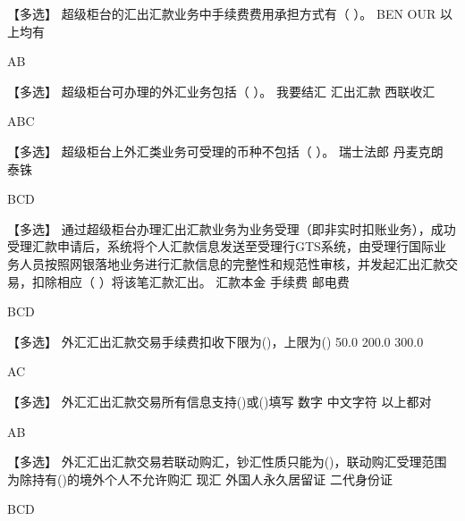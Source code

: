 \documentclass[kindlepaper]{BHCexam4kindle}
\begin{document}
\begin{questions}
\qs 【多选】 超级柜台的汇出汇款业务中手续费费用承担方式有（ ）。 \xx
{} {  BEN } { OUR } { 以上均有 }
\begin{solution} AB \end{solution}
\qs 【多选】 超级柜台可办理的外汇业务包括（ ）。 \xx
{} {  我要结汇 } { 汇出汇款 } { 西联收汇 }
\begin{solution} ABC \end{solution}
\qs 【多选】 超级柜台上外汇类业务可受理的币种不包括（ ）。 \xx
{} {  瑞士法郎 } { 丹麦克朗 } { 泰铢 }
\begin{solution} BCD \end{solution}
\qs 【多选】 通过超级柜台办理汇出汇款业务为业务受理（即非实时扣账业务），成功受理汇款申请后，系统将个人汇款信息发送至受理行GTS系统，由受理行国际业务人员按照网银落地业务进行汇款信息的完整性和规范性审核，并发起汇出汇款交易，扣除相应（ ）将该笔汇款汇出。 \xx
{} {  汇款本金 } { 手续费 } { 邮电费 }
\begin{solution} BCD \end{solution}
\qs 【多选】 外汇汇出汇款交易手续费扣收下限为()，上限为() \xx
{} {  50.0 } { 200.0 } { 300.0 }
\begin{solution} AC \end{solution}
\qs 【多选】 外汇汇出汇款交易所有信息支持()或()填写 \xx
{} {  数字 } { 中文字符 } { 以上都对 }
\begin{solution} AB  \end{solution}
\qs 【多选】 外汇汇出汇款交易若联动购汇，钞汇性质只能为()，联动购汇受理范围为除持有()的境外个人不允许购汇 \xx
{} {  现汇 } { 外国人永久居留证 } { 二代身份证 }
\begin{solution} BCD \end{solution}

\end{questions}
\end{document}
